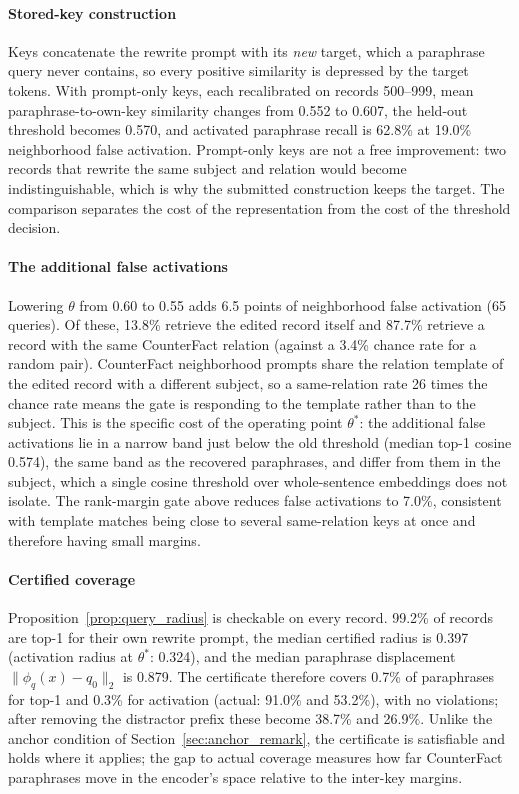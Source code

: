 \documentclass[preprint,12pt]{elsarticle}
\begin{document}
\paragraph{Stored-key construction}
Keys concatenate the rewrite prompt with its \emph{new} target, which a paraphrase query never contains, so every positive similarity is depressed by the target tokens. With prompt-only keys, each recalibrated on records 500--999, mean paraphrase-to-own-key similarity changes from 0.552 to 0.607, the held-out threshold becomes 0.570, and activated paraphrase recall is 62.8\% at 19.0\% neighborhood false activation. Prompt-only keys are not a free improvement: two records that rewrite the same subject and relation would become indistinguishable, which is why the submitted construction keeps the target. The comparison separates the cost of the representation from the cost of the threshold decision.

\paragraph{The additional false activations}
Lowering $\theta$ from 0.60 to 0.55 adds 6.5 points of neighborhood false activation (65 queries). Of these, 13.8\% retrieve the edited record itself and 87.7\% retrieve a record with the same CounterFact relation (against a 3.4\% chance rate for a random pair). CounterFact neighborhood prompts share the relation template of the edited record with a different subject, so a same-relation rate 26 times the chance rate means the gate is responding to the template rather than to the subject. This is the specific cost of the operating point $\theta^*$: the additional false activations lie in a narrow band just below the old threshold (median top-1 cosine 0.574), the same band as the recovered paraphrases, and differ from them in the subject, which a single cosine threshold over whole-sentence embeddings does not isolate. The rank-margin gate above reduces false activations to 7.0\%, consistent with template matches being close to several same-relation keys at once and therefore having small margins.

\paragraph{Certified coverage}
Proposition~\ref{prop:query_radius} is checkable on every record. 99.2\% of records are top-1 for their own rewrite prompt, the median certified radius is 0.397 (activation radius at $\theta^*$: 0.324), and the median paraphrase displacement $\|\phi_q(x)-q_0\|_2$ is 0.879. The certificate therefore covers 0.7\% of paraphrases for top-1 and 0.3\% for activation (actual: 91.0\% and 53.2\%), with no violations; after removing the distractor prefix these become 38.7\% and 26.9\%. Unlike the anchor condition of Section~\ref{sec:anchor_remark}, the certificate is satisfiable and holds where it applies; the gap to actual coverage measures how far CounterFact paraphrases move in the encoder's space relative to the inter-key margins.
\end{document}
